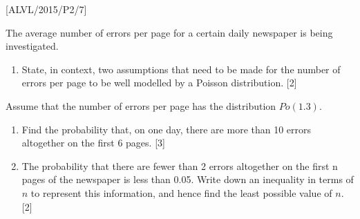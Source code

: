 \item {[}ALVL/2015/P2/7{]}

The average number of errors per page for a certain daily newspaper
is being investigated. 
\begin{enumerate}
\item State, in context, two assumptions that need to be made for the number
of errors per page to be well modelled by a Poisson distribution.
\hfill{}{[}2{]}
\end{enumerate}
Assume that the number of errors per page has the distribution $Po\left(1.3\right)$.
\begin{enumerate}
\item Find the probability that, on one day, there are more than 10 errors
altogether on the first 6 pages. \hfill{}{[}3{]}
\item The probability that there are fewer than 2 errors altogether on the
first n pages of the newspaper is less than 0.05. Write down an inequality
in terms of $n$ to represent this information, and hence find the
least possible value of $n$. \hfill{}{[}2{]}
\end{enumerate}
